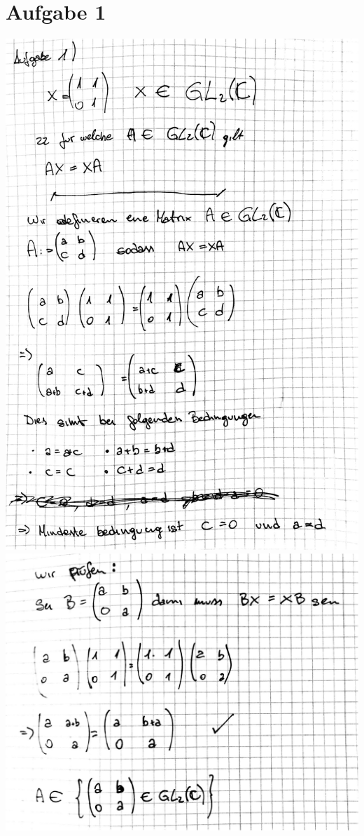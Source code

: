 \documentclass[10pt,a4paper]{article}
\begin{document}
\section{Aufgabe 1}
\includegraphics[width=\textwidth]{lat5a_5.jpg} 
\includegraphics[width=\textwidth]{lat5a_6.jpg} 
\end{document}
